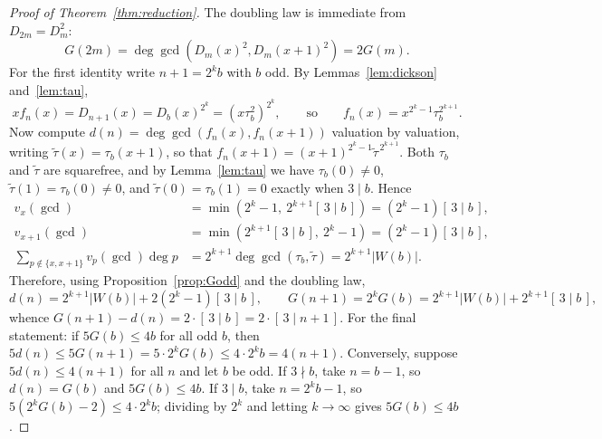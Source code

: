 \documentclass[a4paper]{article}
\theoremstyle{definition}
\newcommand{\abs}[1]{\left| #1 \right|}
\begin{document}
	\begin{proof}[Proof of Theorem~\ref{thm:reduction}]
		The doubling law is immediate from $D_{2m} = D_m^2$:
		\begin{equation*}
			G(2m) = \deg\gcd\left(D_m(x)^2, D_m(x+1)^2\right) = 2 G(m).
		\end{equation*}
		For the first identity write $n + 1 = 2^k b$ with $b$ odd.
		By Lemmas~\ref{lem:dickson} and~\ref{lem:tau},
		\begin{equation*}
			x f_n(x) = D_{n+1}(x) = D_b(x)^{2^k} = \left(x \tau_b^2\right)^{2^k},
			\qquad\text{so}\qquad
			f_n(x) = x^{2^k - 1} \tau_b^{2^{k+1}}.
		\end{equation*}
		Now compute $d(n) = \deg\gcd(f_n(x), f_n(x+1))$ valuation by valuation, writing $\widetilde\tau(x) = \tau_b(x+1)$, so that $f_n(x+1) = (x+1)^{2^k-1}\widetilde\tau^{\,2^{k+1}}$.
		Both $\tau_b$ and $\widetilde\tau$ are squarefree, and by Lemma~\ref{lem:tau} we have $\tau_b(0) \ne 0$, $\widetilde\tau(1) = \tau_b(0) \neq 0$, and $\widetilde\tau(0) = \tau_b(1) = 0$ exactly when $3 \mid b$.
		Hence
		\begin{align*}
			v_x\!\left(\gcd\right) &= \min\!\left(2^k - 1,\ 2^{k+1}[\,3\mid b\,]\right) = \left(2^k-1\right)[\,3\mid b\,],\\
			v_{x+1}\!\left(\gcd\right) &= \min\!\left(2^{k+1}[\,3\mid b\,],\ 2^k-1\right) = \left(2^k-1\right)[\,3\mid b\,],\\
			\sum_{p \notin \{x, x+1\}} v_p\!\left(\gcd\right)\deg p &= 2^{k+1} \deg \gcd\!\left(\tau_b, \widetilde\tau\right) = 2^{k+1}\abs{W(b)} .
		\end{align*}
		Therefore, using Proposition~\ref{prop:Godd} and the doubling law,
		\begin{equation*}
			d(n) = 2^{k+1}\abs{W(b)} + 2\left(2^{k}-1\right)[\,3 \mid b\,],
			\qquad
			G(n+1) = 2^k G(b) = 2^{k+1}\abs{W(b)} + 2^{k+1} [\,3 \mid b\,],
		\end{equation*}
		whence $G(n+1) - d(n) = 2 \cdot [\,3\mid b\,] = 2 \cdot [\,3 \mid n+1\,]$.
		For the final statement: if $5G(b) \leq 4b$ for all odd $b$, then $5 d(n) \leq 5 G(n+1) = 5 \cdot 2^k G(b) \leq 4 \cdot 2^k b = 4(n+1)$.
		Conversely, suppose $5d(n) \le 4(n+1)$ for all $n$ and let $b$ be odd.
		If $3 \nmid b$, take $n = b-1$, so $d(n) = G(b)$ and $5G(b) \le 4b$.
		If $3 \mid b$, take $n = 2^kb - 1$, so $5\left(2^kG(b) - 2\right) \le 4 \cdot 2^k b$; dividing by $2^k$ and letting $k \to \infty$ gives $5G(b) \le 4b$.
	\end{proof}
\end{document}
